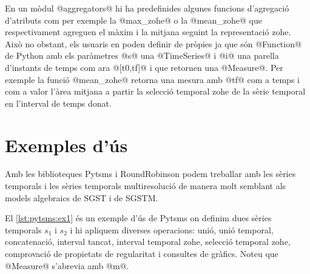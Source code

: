 En un mòdul @aggregators@ hi ha predefinides algunes funcions
d'agregació d'atributs com per exemple la @max_zohe@ o la
@mean_zohe@ que respectivament agreguen el màxim i la mitjana seguint
la representació \gls{zohe}.  Això no obstant, els usuaris en poden
definir de pròpies ja que són @Function@ de Python amb els paràmetres
@s@ una @TimeSeries@ i @i@ una parella d'instants de temps com ara
@[t0,tf]@ i que retornen una @Measure@. Per exemple la funció
@mean_zohe@ retorna una mesura amb @tf@ com a temps i com a valor
l'àrea mitjana a partir la selecció temporal \gls{zohe} de la sèrie
temporal en l'interval de temps donat.






\section{Exemples d'ús}


Amb les biblioteques Pytsms i RoundRobinson podem treballar amb les
sèries temporals i les sèries temporals multiresolució de manera molt
semblant als models algebraics de \gls{SGST} i de \gls{SGSTM}.




El \autoref{lst:pytsms:ex1} és un exemple d'ús de Pytsms on definim
dues sèries temporals $s_1$ i $s_2$ i hi apliquem diverses operacions:
unió, unió temporal, concatenació, interval tancat, interval temporal
\gls{zohe}, selecció temporal \gls{zohe}, comprovació de propietats de
regularitat i consultes de gràfics. Noteu que @Measure@ s'abrevia amb
@m@.

